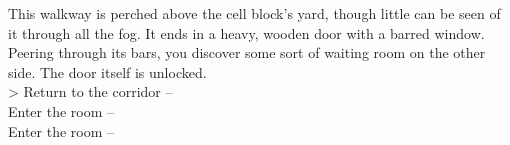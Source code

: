This walkway is perched above the cell block’s yard, though little can be seen of it through all the fog. It ends in a heavy, wooden door with a barred window. Peering through its bars, you discover some sort of waiting room on the other side. The door itself is unlocked.\\

> Return to the corridor -- \\
 Enter the room -- \\
 Enter the room -- \\